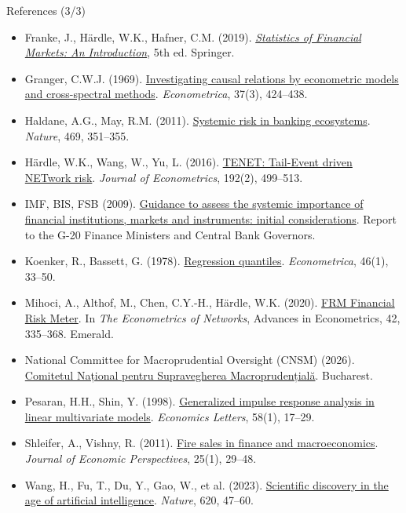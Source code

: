 \begin{frame}{References (3/3)}
\itemsize{\tiny}
\begin{itemize}
    \item Franke, J., Härdle, W.K., Hafner, C.M. (2019). \href{https://doi.org/10.1007/978-3-030-13751-9}{\textit{Statistics of Financial Markets: An Introduction}}, 5th ed. Springer.
    \item Granger, C.W.J. (1969). \href{https://doi.org/10.2307/1912791}{Investigating causal relations by econometric models and cross-spectral methods}. \textit{Econometrica}, 37(3), 424--438.
    \item Haldane, A.G., May, R.M. (2011). \href{https://doi.org/10.1038/nature09659}{Systemic risk in banking ecosystems}. \textit{Nature}, 469, 351--355.
    \item Härdle, W.K., Wang, W., Yu, L. (2016). \href{https://doi.org/10.1016/j.jeconom.2016.02.013}{TENET: Tail-Event driven NETwork risk}. \textit{Journal of Econometrics}, 192(2), 499--513.
    \item IMF, BIS, FSB (2009). \href{https://www.bis.org/publ/othp07.htm}{Guidance to assess the systemic importance of financial institutions, markets and instruments: initial considerations}. Report to the G-20 Finance Ministers and Central Bank Governors.
    \item Koenker, R., Bassett, G. (1978). \href{https://doi.org/10.2307/1913643}{Regression quantiles}. \textit{Econometrica}, 46(1), 33--50.
    \item Mihoci, A., Althof, M., Chen, C.Y.-H., Härdle, W.K. (2020). \href{https://doi.org/10.1108/s0731-905320200000042016}{FRM Financial Risk Meter}. In \textit{The Econometrics of Networks}, Advances in Econometrics, 42, 335--368. Emerald.
    \item National Committee for Macroprudential Oversight (CNSM) (2026). \href{https://www.cnsmro.ro/}{Comitetul Național pentru Supravegherea Macroprudențială}. Bucharest.
    \item Pesaran, H.H., Shin, Y. (1998). \href{https://doi.org/10.1016/S0165-1765(97)00214-0}{Generalized impulse response analysis in linear multivariate models}. \textit{Economics Letters}, 58(1), 17--29.
    \item Shleifer, A., Vishny, R. (2011). \href{https://doi.org/10.1257/jep.25.1.29}{Fire sales in finance and macroeconomics}. \textit{Journal of Economic Perspectives}, 25(1), 29--48.
    \item Wang, H., Fu, T., Du, Y., Gao, W., et al. (2023). \href{https://doi.org/10.1038/s41586-023-06221-2}{Scientific discovery in the age of artificial intelligence}. \textit{Nature}, 620, 47--60.
\end{itemize}
\end{frame}


